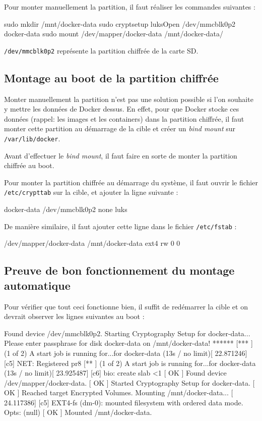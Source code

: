 \documentclass[11pt,a4paper,oneside]{report}
\newcommand{\code}[1]{\texttt{#1}}
\begin{document}
Pour monter manuellement la partition, il faut réaliser les commandes suivantes :
\begin{bashcode}
sudo mkdir /mnt/docker-data
sudo cryptsetup luksOpen /dev/mmcblk0p2 docker-data
sudo mount /dev/mapper/docker-data /mnt/docker-data/
\end{bashcode}

\code{/dev/mmcblk0p2} représente la partition chiffrée de la carte SD.

\subsection{Montage au boot de la partition chiffrée}
Monter manuellement la partition n'est pas une solution possible si l'on souhaite y mettre les données de Docker dessus. En effet, pour que Docker stocke ces données (rappel: les images et les containers) dans la partition chiffrée, il faut monter cette partition au démarrage de la cible et créer un \textit{bind mount} sur \code{/var/lib/docker}.


Avant d'effectuer le \textit{bind mount}, il faut faire en sorte de monter la partition chiffrée au boot.


Pour monter la partition chiffrée au démarrage du système, il faut ouvrir le fichier \code{/etc/crypttab} sur la cible, et ajouter la ligne suivante :
\begin{bashcode}
docker-data /dev/mmcblk0p2  none luks
\end{bashcode}

De manière similaire, il faut ajouter cette ligne dans le fichier \code{/etc/fstab} :
\begin{bashcode}
/dev/mapper/docker-data /mnt/docker-data ext4 rw 0 0
\end{bashcode}


\subsection{Preuve de bon fonctionnement du montage automatique}
Pour vérifier que tout ceci fonctionne bien, il suffit de redémarrer la cible et on devrait observer les lignes suivantes au boot :

\begin{bashcode}
[  OK  ] Found device /dev/mmcblk0p2.
         Starting Cryptography Setup for docker-data...
Please enter passphrase for disk docker-data on /mnt/docker-data! ******
[***   ] (1 of 2) A start job is running for...for docker-data (13s / no limit)[   22.871246] [c5] NET: Registered pr8
[**    ] (1 of 2) A start job is running for...for docker-data (13s / no limit)[   23.925487] [c6] bio: create slab <1
[  OK  ] Found device /dev/mapper/docker-data.
[  OK  ] Started Cryptography Setup for docker-data.
[  OK  ] Reached target Encrypted Volumes.
         Mounting /mnt/docker-data...
[   24.117386] [c5] EXT4-fs (dm-0): mounted filesystem with ordered data mode. Opts: (null)
[  OK  ] Mounted /mnt/docker-data.
\end{bashcode}
\end{document}
